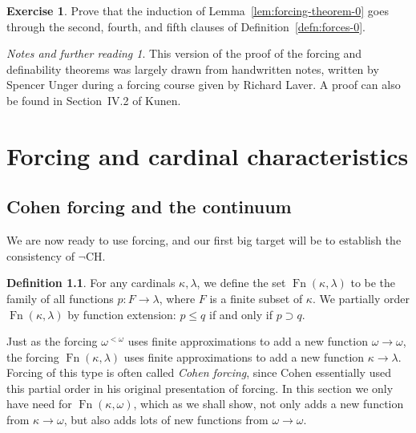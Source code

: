 \documentclass[11pt,oneside]{amsbook}
\DeclareMathOperator{\Fn}{Fn}
\theoremstyle{definition}
\newtheorem{exerc}{Exercise}[section]
\theoremstyle{plain}
\theoremstyle{definition}
\newtheorem{definition}[theorem]{Definition}
\theoremstyle{remark}
\newtheorem*{notes}{Notes and further reading}
\numberwithin{equation}{section}
\numberwithin{figure}{section}
\begin{document}
\begin{exerc}
  \label{exerc:forcing-clauses-245}
  Prove that the induction of Lemma~\ref{lem:forcing-theorem-0} goes through the second, fourth, and fifth clauses of Definition~\ref{defn:forces-0}.
\end{exerc}

\begin{notes}
  This version of the proof of the forcing and definability theorems was largely drawn from handwritten notes, written by Spencer Unger during a forcing course given by Richard Laver. A proof can also be found in Section~IV.2 of Kunen.
\end{notes}


\chapter{Forcing and cardinal characteristics}

\section{Cohen forcing and the continuum}

We are now ready to use forcing, and our first big target will be to establish the consistency of $\neg$CH.

\begin{definition}
  For any cardinals $\kappa,\lambda$, we define the set $\Fn(\kappa,\lambda)$ to be the family of all functions $p\colon F\to\lambda$, where $F$ is a finite subset of $\kappa$. We partially order $\Fn(\kappa,\lambda)$ by function extension: $p\leq q$ if and only if $p\supset q$.
\end{definition}

Just as the forcing $\omega^{<\omega}$ uses finite approximations to add a new function $\omega\to\omega$, the forcing $\Fn(\kappa,\lambda)$ uses finite approximations to add a new function $\kappa\to\lambda$. Forcing of this type is often called \emph{Cohen forcing}, since Cohen essentially used this partial order in his original presentation of forcing. In this section we only have need for $\Fn(\kappa,\omega)$, which as we shall show, not only adds a new function from $\kappa\to\omega$, but also adds lots of new functions from $\omega\to\omega$.
\end{document}
